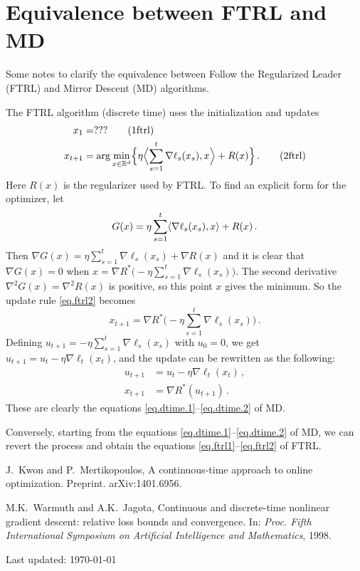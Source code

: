 \documentclass[12pt]{article}
\theoremstyle{plain}
\theoremstyle{definition}
\theoremstyle{remark}
\begin{document}
\newpage

\section*{Equivalence between FTRL and MD}

Some notes to clarify the equivalence between 
Follow the Regularized Leader (FTRL) and Mirror Descent (MD) algorithms.

\medskip

The FTRL algorithm (discrete time) uses the initialization and updates
\begin{align}
x_1 &= ??? \label{eq.ftrl1} \tag{1ftrl} \\
x_{t+1} &= \arg\min_{x \in \mathbb{R}^d} \Bigl\{ \eta \Bigl\langle { \sum_{s=1}^{t} \nabla\ell_s(x_{s}), x} \Bigr\rangle + R(x)\Bigr\}\,.
 \label{eq.ftrl2} 
\tag{2ftrl}
\end{align}
Here $R(x)$ is the regularizer used by FTRL.
To find an explicit form for the optimizer, let
$$
G(x) = \eta \sum_{s=1}^{t} \langle { \nabla\ell_s(x_{s}), x}\rangle + R(x)\,.
$$
Then $\nabla G(x) = \eta \sum_{s=1}^{t} \nabla\ell_s(x_{s}) + \nabla R(x)$
and it is clear that $\nabla G(x) = 0$ 
when $x = \nabla R^{*} \bigl( -\eta \sum_{s=1}^{t} \nabla\ell_s(x_{s}) \bigr)$.
The second derivative $\nabla^2 G(x) = \nabla^2 R(x)$ is positive,
so this point $x$ gives the minimum.
So the update rule \eqref{eq.ftrl2} becomes
$$
x_{t+1} = \nabla R^{*} \bigl( -\eta \sum_{s=1}^{t} \nabla\ell_s(x_{s}) \bigr)\,.
$$
Defining $u_{t+1} = -\eta \sum_{s=1}^{t} \nabla\ell_s(x_{s})$ with $u_{0} = 0$,
we get $u_{t+1} = u_{t} - \eta \nabla\ell_t(x_{t})$,
and the update can be rewritten as the following:
\begin{align*}
u_{t+1} &= u_{t} - \eta \nabla \ell_{t}(x_{t})\,, \\
x_{t+1} &= \nabla R^{*}(u_{t+1})\,. 
\end{align*}
These are clearly the equations \eqref{eq.dtime.1}--\eqref{eq.dtime.2} of MD.

\medskip

Conversely, starting from the equations \eqref{eq.dtime.1}--\eqref{eq.dtime.2} of MD,
we can revert the process and obtain the equations \eqref{eq.ftrl1}--\eqref{eq.ftrl2} of FTRL.

\medskip

\begin{thebibliography}{biblio}

  J.~Kwon and P.~Mertikopoulos,
  A continuous-time approach to online optimization.
  Preprint. arXiv:1401.6956.

  M.K.~Warmuth and A.K.~Jagota,
  Continuous and discrete-time nonlinear gradient descent: relative loss bounds and convergence.
  In: 
  \textit{Proc. Fifth International Symposium on Artificial Intelligence and Mathematics}, 1998.


\end{thebibliography}


\vspace{.5cm}


\noindent
Last updated: \today
\end{document}
